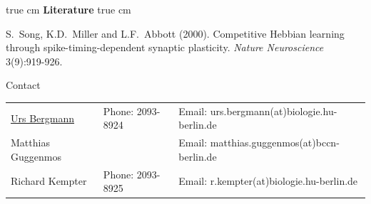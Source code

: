 \documentclass[12pt]{article}
\begin{document}
 true cm
{\bf Literature}
 true cm

S.~Song, K.D.~Miller and L.F.~Abbott (2000). Competitive Hebbian learning
through spike-timing-dependent synaptic plasticity.
\emph{Nature Neuroscience} 3(9):919-926.\newline

\vfill
\centerline{\CAP Contact}
\CAP

\begin{tabular}{lll}
\underline{Urs Bergmann} & Phone: 2093-8924 & Email:
urs.bergmann(at)biologie.hu-berlin.de \\
Matthias Guggenmos & & Email: matthias.guggenmos(at)bccn-berlin.de \\
Richard Kempter \hfill & Phone: 2093-8925 \hfill & Email:
r.kempter(at)biologie.hu-berlin.de \\
\end{tabular}
\end{document}
